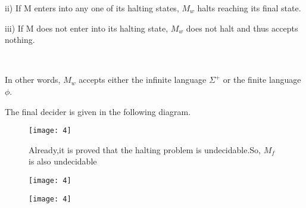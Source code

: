 \documentclass[10pt,a4paper]{book}
\begin{document}
ii)\; If M enters into any one of its halting states, $M_{w}$ halts reaching its final state.

iii)\; If M does not enter into its halting state, $M_{w}$ does not halt and thus accepts nothing.

\,

In other words, $M_{w}$ accepts either the infinite language $\Sigma^{+}$ or the finite language $\phi$.

The final decider is given in the following diagram.

\begin{figure}
  \centering
  \texttt{[image: 4]}\\

  \qquad

  \!\!\!\!\!\!\!\!\!\!\!\!\!\!\!\!\!\!\!\!\!\!\!\!\!\!\! Already,it is proved that the halting problem is undecidable.So, $M_{f}$ is also undecidable
\end{figure}

\begin{figure}
  \centering
  \texttt{[image: 4]}\\
\end{figure}

\begin{figure}
  \centering
  \texttt{[image: 4]}\\
\end{figure}
\end{document}
